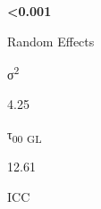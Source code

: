 \documentclass[
  letterpaper,
  DIV=11,
  numbers=noendperiod]{scrartcl}
\begin{document}
\begin{table}
\begin{minipage}[t]{\linewidth}
{\textbf{\textless0.001}

}

\end{minipage}%
\newline
\begin{minipage}[t]{\linewidth}

{\centering 

Random Effects

}

\end{minipage}%
\newline
\begin{minipage}[t]{\linewidth}

{\centering 

σ\textsuperscript{2}

}

\end{minipage}%
\newline
\begin{minipage}[t]{\linewidth}

{\centering 

4.25

}

\end{minipage}%
\newline
\begin{minipage}[t]{\linewidth}

{\centering 

τ\textsubscript{00} \textsubscript{GL}

}

\end{minipage}%
\newline
\begin{minipage}[t]{\linewidth}

{\centering 

12.61

}

\end{minipage}%
\newline
\begin{minipage}[t]{\linewidth}

{\centering 

ICC

}

\end{minipage}%
\newline
\begin{minipage}[t]{\linewidth}

{\centering 

}
\end{minipage}
\end{table}
\end{document}
